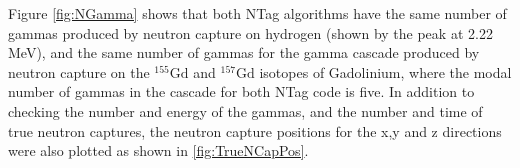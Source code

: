 Figure \ref{fig:NGamma} shows that both NTag algorithms have the same number of gammas produced by neutron capture on hydrogen (shown by the peak at 2.22 MeV), and the same number of gammas for the gamma cascade produced by neutron capture on the ${ }^{155} \mathrm{Gd}$ and 
${ }^{157} \mathrm{Gd}$ isotopes of Gadolinium, where the modal number of gammas in the cascade for both NTag code is five. In addition to checking the number and energy of the gammas, and the number and time of true neutron captures, the neutron capture positions for the x,y and z directions were also plotted as shown in \ref{fig:TrueNCapPos}.

\begin{figure}
\centering
    \begin{minipage}{0.5\linewidth}
    \end{minipage}%
    \begin{minipage}{0.5\linewidth}
    \centering

\end{minipage}
\end{figure}
